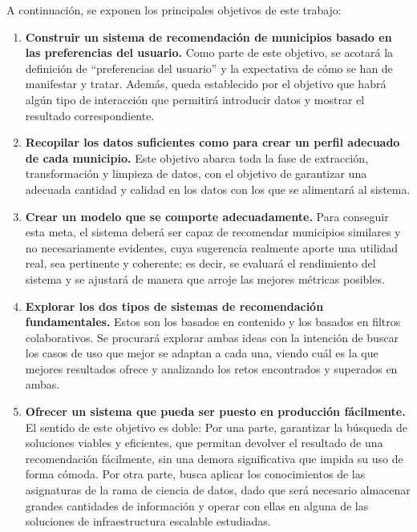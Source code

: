 
A continuación, se exponen los principales objetivos de este trabajo:

\begin{enumerate}
    \item \textbf{Construir un sistema de recomendación de municipios basado en las preferencias del usuario.} Como parte de este objetivo, se acotará la definición de ``preferencias del usuario'' y la expectativa de cómo se han de manifestar y tratar. Además, queda establecido por el objetivo que habrá algún tipo de interacción que permitirá introducir datos y mostrar el resultado correspondiente.
    \item \textbf{Recopilar los datos suficientes como para crear un perfil adecuado de cada municipio.} Este objetivo abarca toda la fase de extracción, transformación y limpieza de datos, con el objetivo de garantizar una adecuada cantidad y calidad en los datos con los que se alimentará al sistema.
    \item \textbf{Crear un modelo que se comporte adecuadamente.} Para conseguir esta meta, el sistema deberá ser capaz de recomendar municipios similares y no necesariamente evidentes, cuya sugerencia realmente aporte una utilidad real, sea pertinente y coherente; es decir, se evaluará el rendimiento del sistema y se ajustará de manera que arroje las mejores métricas posibles.
    \item \textbf{Explorar los dos tipos de sistemas de recomendación fundamentales.} Estos son los basados en contenido y los basados en filtros colaborativos. Se procurará explorar ambas ideas con la intención de buscar los casos de uso que mejor se adaptan a cada una, viendo cuál es la que mejores resultados ofrece y analizando los retos encontrados y superados en ambas.
    \item \textbf{Ofrecer un sistema que pueda ser puesto en producción fácilmente.} El sentido de este objetivo es doble: Por una parte, garantizar la búsqueda de soluciones viables y eficientes, que permitan devolver el resultado de una recomendación fácilmente, sin una demora significativa que impida su uso de forma cómoda. Por otra parte, busca aplicar los conocimientos de las asignaturas de la rama de ciencia de datos, dado que será necesario almacenar grandes cantidades de información y operar con ellas en alguna de las soluciones de infraestructura escalable estudiadas.

\end{enumerate}
